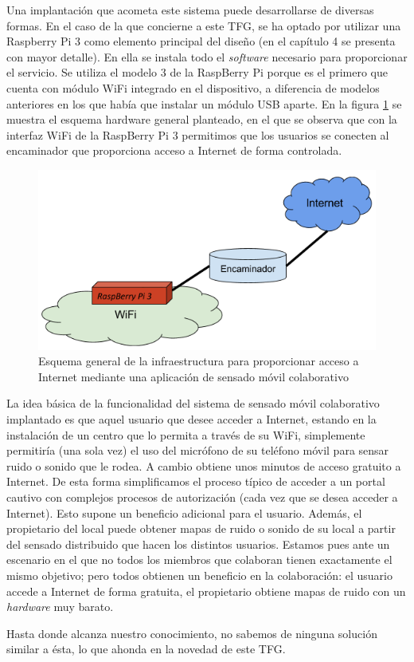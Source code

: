 Una implantación que acometa este sistema puede desarrollarse de diversas formas. En el caso de la que concierne a este TFG, se ha optado por utilizar una Raspberry Pi 3 como elemento principal del diseño (en el capítulo 4 se presenta con mayor detalle). En ella se instala todo el \emph{software} necesario para proporcionar el servicio. Se utiliza el modelo 3 de la RaspBerry Pi porque es el primero que cuenta con módulo WiFi integrado en el dispositivo, a diferencia de modelos anteriores en los que había que instalar un módulo USB aparte. En la figura \ref{SystemScheme} se muestra el esquema hardware general planteado, en el que se observa que con la interfaz WiFi de la RaspBerry Pi 3 permitimos que los usuarios se conecten al encaminador que proporciona acceso a Internet de forma controlada.

\begin{figure}[!t]
\begin{center}
\includegraphics[width=0.75\linewidth]{./2_SensadoCol/Img/SystemScheme.png}
\end{center}
\caption{Esquema general de la infraestructura para proporcionar acceso a Internet mediante una aplicación de sensado móvil colaborativo}
\label{SystemScheme}
\end{figure}

La idea básica de la funcionalidad del sistema de sensado móvil colaborativo implantado es que aquel usuario que desee acceder a Internet, estando en la instalación de un centro que lo permita a través de su WiFi, simplemente permitiría (una sola vez) el uso del micrófono de su teléfono móvil para sensar ruido o sonido que le rodea. A cambio obtiene unos minutos de acceso gratuito a Internet. De esta forma simplificamos el proceso típico de acceder a un portal cautivo con complejos procesos de autorización (cada vez que se desea acceder a Internet). Esto supone un beneficio adicional para el usuario. Además, el propietario del local puede obtener mapas de ruido o sonido de su local a partir del sensado distribuido que hacen los distintos usuarios. Estamos pues ante un escenario en el que no todos los miembros que colaboran tienen exactamente el mismo objetivo; pero todos obtienen un beneficio en la colaboración: el usuario accede a Internet de forma gratuita, el propietario obtiene mapas de ruido con un \emph{hardware} muy barato.

Hasta donde alcanza nuestro conocimiento, no sabemos de ninguna solución similar a ésta, lo que ahonda en la novedad de este TFG. 